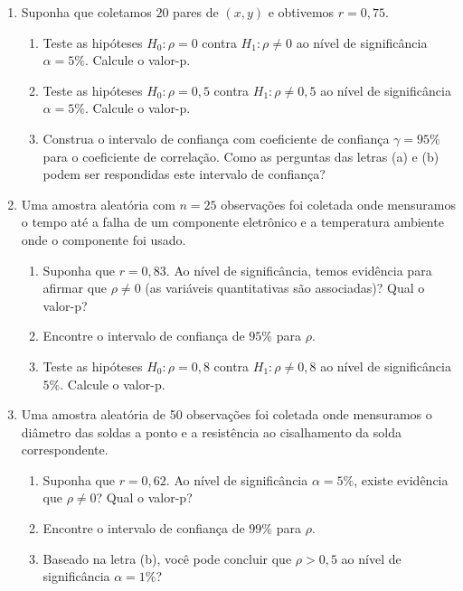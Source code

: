 \documentclass[8pt, a4paper]{article}
\begin{document}
\begin{enumerate}
	\item Suponha que coletamos $20$ pares de $(x, y)$ e obtivemos $r=0,75$.
	\begin{enumerate}
		\item Teste as hipóteses $H_0: \rho = 0$ contra $H_1: \rho \neq 0$ ao nível de significância $\alpha=5\%$. Calcule o valor-p.
		\item Teste as hipóteses $H_0: \rho = 0,5$ contra $H_1: \rho \neq 0,5$ ao nível de significância $\alpha=5\%$. Calcule o valor-p.
		\item Construa o intervalo de confiança com coeficiente de confiança $\gamma = 95\%$ para o coeficiente de correlação. Como as perguntas das letras (a) e (b) podem ser respondidas este intervalo de confiança?
	\end{enumerate}
	
	\item Uma amostra aleatória com $n=25$ observações foi coletada onde mensuramos o tempo até a falha de um componente eletrônico e a temperatura ambiente onde o componente foi usado.
	\begin{enumerate}
		\item Suponha que $r=0,83$. Ao nível de significância, temos evidência para afirmar que $\rho \neq 0$ (as variáveis quantitativas são associadas)? Qual o valor-p?
		\item Encontre o intervalo de confiança de $95\%$ para $\rho$.
		\item Teste as hipóteses $H_0: \rho = 0,8$ contra $H_1: \rho \neq 0,8$ ao nível de significância $5\%$. Calcule o valor-p.
	\end{enumerate}

	\item Uma amostra aleatória de 50 observações foi coletada onde mensuramos o diâmetro das soldas a ponto e a resistência ao cisalhamento da solda correspondente.
	\begin{enumerate}
		\item Suponha que $r=0,62$. Ao nível de significância $\alpha=5\%$, existe evidência que $\rho \neq 0$? Qual o valor-p?
		\item Encontre o intervalo de confiança de $99\%$ para $\rho$.
		\item Baseado na letra (b), você pode concluir que $\rho > 0,5$ ao nível de significância $\alpha=1\%$?
	\end{enumerate}


\end{enumerate}
\end{document}

